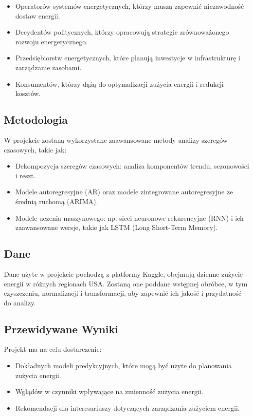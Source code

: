 \begin{itemize}
    \item Operatorów systemów energetycznych, którzy muszą zapewnić niezawodność dostaw energii.
    \item Decydentów politycznych, którzy opracowują strategie zrównoważonego rozwoju energetycznego.
    \item Przedsiębiorstw energetycznych, które planują inwestycje w infrastrukturę i zarządzanie zasobami.
    \item Konsumentów, którzy dążą do optymalizacji zużycia energii i redukcji kosztów.
\end{itemize}

\subsection{Metodologia}
W projekcie zostaną wykorzystane zaawansowane metody analizy szeregów czasowych, takie jak:

\begin{itemize}
    \item Dekompozycja szeregów czasowych: analiza komponentów trendu, sezonowości i reszt.
    \item Modele autoregresyjne (AR) oraz modele zintegrowane autoregresyjne ze średnią ruchomą (ARIMA).
    \item Modele uczenia maszynowego: np. sieci neuronowe rekurencyjne (RNN) i ich zaawansowane wersje, takie jak LSTM (Long Short-Term Memory).
\end{itemize}

\subsection{Dane}

Dane użyte w projekcie pochodzą z platformy Kaggle, obejmują dzienne zużycie energii w różnych regionach USA. Zostaną one poddane wstępnej obróbce, w tym czyszczeniu, normalizacji i transformacji, aby zapewnić ich jakość i przydatność do analizy.

\subsection{Przewidywane Wyniki}

Projekt ma na celu dostarczenie:

\begin{itemize}
    \item Dokładnych modeli predykcyjnych, które mogą być użyte do planowania zużycia energii.
    \item Wglądów w czynniki wpływające na zmienność zużycia energii.
    \item Rekomendacji dla interesariuszy dotyczących zarządzania zużyciem energii.
\end{itemize}

